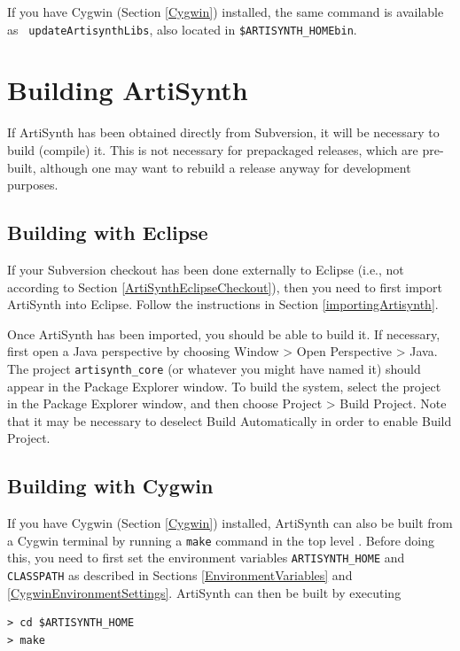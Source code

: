 \ifWindows
If you have Cygwin (Section \ref{Cygwin}) installed, 
the same command is available as {\tt
updateArtisynthLibs}, also located in {\tt \$ARTISYNTH\_HOME\SEP bin}.
\else\fi

\section{Building ArtiSynth}
\label{Building}

If ArtiSynth has been obtained directly from Subversion, it will be
necessary to build (compile) it. This is not necessary for prepackaged
releases, which are pre-built, although one may want to rebuild a
release anyway for development purposes.

\subsection{Building with Eclipse}
\label{BuildingWithEclipse}

If your Subversion checkout has been done externally to Eclipse (i.e.,
not according to Section \ref{ArtiSynthEclipseCheckout}), then you
need to first import ArtiSynth into Eclipse. Follow the instructions
in Section \ref{importingArtisynth}.

Once ArtiSynth has been imported, you should be able to build it.  If
necessary, first open a Java perspective by choosing {\sf Window >
Open Perspective > Java}. The project {\tt artisynth\_core} (or
whatever you might have named it) should appear in the {\sf Package
Explorer} window. To build the system, select the project in the {\sf
Package Explorer} window, and then choose {\sf Project > Build
Project}. Note that it may be necessary to deselect {\sf Build
Automatically} in order to enable {\sf Build Project}.

\ifWindows
\subsection{Building with Cygwin}
\label{BuildingWithCygwin}

If you have Cygwin (Section \ref{Cygwin}) installed, 
ArtiSynth can also be built from a Cygwin terminal by running
a {\tt make} command in the top level \directory. Before doing this,
you need to first set the environment variables {\tt ARTISYNTH\_HOME}
and {\tt CLASSPATH} as described in Sections
\ref{EnvironmentVariables} and \ref{CygwinEnvironmentSettings}.
ArtiSynth can then be built by executing

\begin{verbatim}
> cd $ARTISYNTH_HOME
> make
\end{verbatim}
\else
